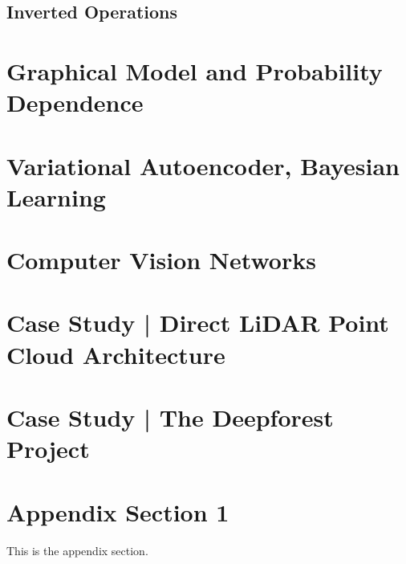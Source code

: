 \documentclass[]{article}
\theoremstyle{definition}
\numberwithin{equation}{subsection}
\begin{document}
    \subsection{Inverted Operations}

    
\section{Graphical Model and Probability Dependence}
    
\section{Variational Autoencoder, Bayesian Learning}

\section{Computer Vision Networks}
    
\section{Case Study | Direct LiDAR Point Cloud Architecture}
    
\section{Case Study | The Deepforest Project}



\appendix
\section{Appendix Section 1}
    This is the appendix section. 





% 
\end{document}
